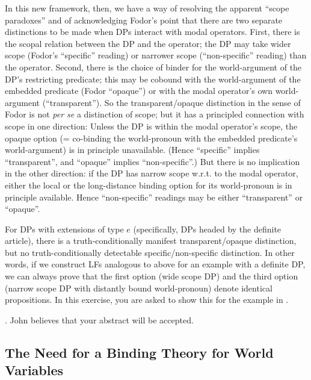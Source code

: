 In this new framework, then, we have a way of resolving the apparent ``scope paradoxes'' and of acknowledging Fodor's point that there are two separate distinctions to be made when DPs interact with modal operators. First, there is the scopal relation between the DP and the operator; the DP may take wider scope (Fodor's ``specific'' reading) or narrower scope (``non-specific'' reading) than the operator. Second, there is the choice of binder for the world-argument of the DP's restricting predicate; this may be cobound with the world-argument of the embedded predicate (Fodor ``opaque'') or with the modal operator's own world-argument (``transparent''). So the transparent/opaque distinction in the sense of Fodor is not \emph{per se} a distinction of scope; but it has a principled connection with scope in one direction: Unless the DP is within the modal operator's scope, the opaque option (= co-binding the world-pronoun with the embedded predicate's world-argument) is in principle unavailable. (Hence ``specific'' implies ``transparent'', and ``opaque'' implies ``non-specific''.) But there is no implication in the other direction: if the DP has narrow scope w.r.t. to the modal operator, either the local or the long-distance binding option for its world-pronoun is in principle available. Hence ``non-specific'' readings may be either ``transparent'' or ``opaque''.

\begin{exercise}\label{yourabstract}
	
	For DPs with extensions of type $e$ (specifically, DPs headed by the definite article), there is a truth-conditionally manifest transparent/opaque distinction, but no truth-conditionally detectable specific/non-specific distinction. In other words, if we construct LFs analogous to \Last[a-c] above for an example with a definite DP, we can always prove that the first option (wide scope DP) and the third option (narrow scope DP with distantly bound world-pronoun) denote identical propositions. In this exercise, you are asked to show this for the example in \Next.
	
	\ex. John believes that your abstract will be accepted. \eex

\end{exercise}

\subsection{The Need for a Binding Theory for World Variables}

